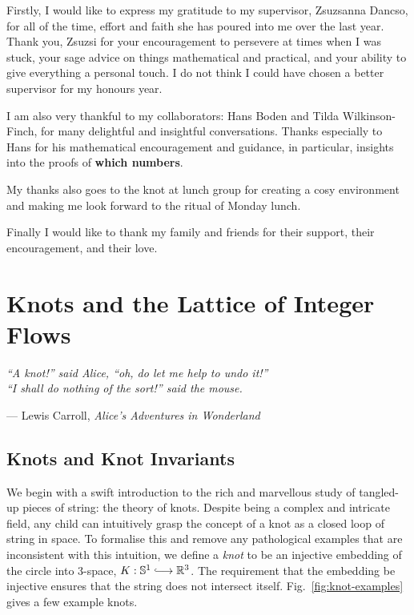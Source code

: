 \documentclass[12pt]{report}
\newcommand{\R}{\mathbb{R}}
\renewcommand{\S}{\mathbb{S}}
\newcommand{\inject}{\lhook\joinrel\longrightarrow}
\newcommand{\notered}[1]{{\color{Red} \textbf{#1}}}
\theoremstyle{upright}
\begin{document}
Firstly, I would like to express my gratitude to my supervisor, Zsuzsanna Dancso, for all of the time, effort and faith she has poured into me over the last year. Thank you, Zsuzsi for your encouragement to persevere at times when I was stuck, your sage advice on things mathematical and practical, and your ability to give everything a personal touch. I do not think I could have chosen a better supervisor for my honours year.

I am also very thankful to my collaborators: Hans Boden and Tilda Wilkinson-Finch, for many delightful and insightful conversations. Thanks especially to Hans for his mathematical encouragement and guidance, in particular, insights into the proofs of \notered{which numbers}.

My thanks also goes to the knot at lunch group for creating a cosy environment and making me look forward to the ritual of Monday lunch.

Finally I would like to thank my family and friends for their support, their encouragement, and their love.

\chapter{Knots and the Lattice of Integer Flows}
\epigraph{\itshape ``A knot!'' said Alice, ``oh, do let me help to undo it!''\\``I shall do nothing of the sort!'' said the mouse.}{--- Lewis Carroll, \textit{Alice's Adventures in Wonderland}}

\section{Knots and Knot Invariants}

We begin with a swift introduction to the rich and marvellous study of tangled-up pieces of string: the theory of knots. Despite being a complex and intricate field, any child can intuitively grasp the concept of a knot as a closed loop of string in space. To formalise this and remove any pathological examples that are inconsistent with this intuition, we define a \textit{knot} to be an injective embedding of the circle into $3$-space, $K: \S^{1} \inject \R^{3}$. The requirement that the embedding be injective ensures that the string does not intersect itself. Fig.~\ref{fig:knot-examples} gives a few example knots.
\end{document}
